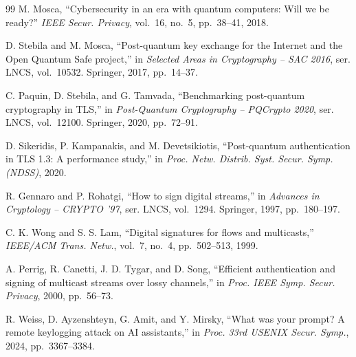 \documentclass[conference]{IEEEtran}
\begin{document}
\begin{thebibliography}{99}
 M. Mosca, ``Cybersecurity in an era with quantum computers: Will we be
ready?'' \textit{IEEE Secur. Privacy}, vol.~16, no.~5, pp.~38--41, 2018.

 D. Stebila and M. Mosca, ``Post-quantum key exchange for the Internet and the
Open Quantum Safe project,'' in \textit{Selected Areas in Cryptography -- SAC 2016}, ser. LNCS,
vol.~10532. Springer, 2017, pp.~14--37.

 C. Paquin, D. Stebila, and G. Tamvada, ``Benchmarking post-quantum
cryptography in TLS,'' in \textit{Post-Quantum Cryptography -- PQCrypto 2020}, ser. LNCS, vol.~12100.
Springer, 2020, pp.~72--91.

 D. Sikeridis, P. Kampanakis, and M. Devetsikiotis,
``Post-quantum authentication in TLS 1.3: A performance study,'' in \textit{Proc. Netw. Distrib. Syst.
Secur. Symp. (NDSS)}, 2020.

 R. Gennaro and P. Rohatgi, ``How to sign digital streams,'' in
\textit{Advances in Cryptology -- CRYPTO '97}, ser. LNCS, vol.~1294. Springer, 1997, pp.~180--197.

 C. K. Wong and S. S. Lam, ``Digital signatures for flows and multicasts,''
\textit{IEEE/ACM Trans. Netw.}, vol.~7, no.~4, pp.~502--513, 1999.

 A. Perrig, R. Canetti, J. D. Tygar, and D. Song, ``Efficient authentication
and signing of multicast streams over lossy channels,'' in \textit{Proc. IEEE Symp. Secur. Privacy},
2000, pp.~56--73.

 R. Weiss, D. Ayzenshteyn, G. Amit, and Y. Mirsky, ``What was your prompt?
A remote keylogging attack on AI assistants,'' in \textit{Proc. 33rd USENIX Secur. Symp.}, 2024,
pp.~3367--3384.

\end{thebibliography}
\end{document}
